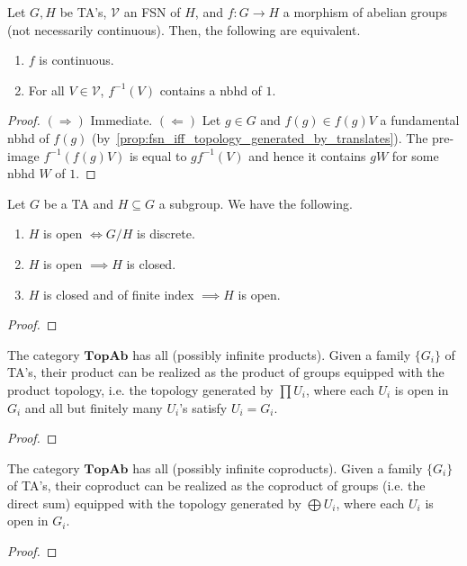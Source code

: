 \begin{proposition} Let $G, H$ be TA's, $\mathcal{V}$ an FSN of $H$, and $f : G \rightarrow H$ a morphism of abelian groups (not necessarily continuous). Then, the following are equivalent.
\begin{enumerate}
\item[(i)] $f$ is continuous.
\item[(ii)] For all $V \in \mathcal{V}$, $f^{-1}(V)$ contains a nbhd of $1$.
\end{enumerate}
\end{proposition}
\begin{proof} $(\Rightarrow)$ Immediate. $(\Leftarrow)$ Let $g \in G$ and $f(g) \in f(g)V$ a fundamental nbhd of $f(g)$ (by~\cref{prop:fsn_iff_topology_generated_by_translates}). The pre-image $f^{-1}(f(g) V)$ is equal to $gf^{-1}(V)$ and hence it contains $gW$ for some nbhd $W$ of $1$.
\end{proof}

\begin{proposition}\label{prop:basic_properties_about_open_sets} Let $G$ be a TA and $H \subseteq G$ a subgroup. We have the following.
\begin{enumerate}
    \item[(i)] $H$ is open $\iff G/H$ is discrete.
    \item[(ii)] $H$ is open $\implies H$ is closed.
    \item[(iii)] $H$ is closed and of finite index $\implies H$ is open.
\end{enumerate}
\end{proposition}
\begin{proof} \TODO
\end{proof}

\begin{proposition}\label{prop:topab_has_products} The category $\textbf{TopAb}$ has all (possibly infinite products). Given a family $\{G_i\}$ of TA's, their product can be realized as the product of groups equipped with the product topology, i.e. the topology generated by $\prod U_i$, where each $U_i$ is open in $G_i$ and all but finitely many $U_i$'s satisfy $U_i = G_i$.
\end{proposition}
\begin{proof} \TODO
\end{proof}


\begin{proposition}\label{prop:topab_has_coproducts} The category $\textbf{TopAb}$ has all (possibly infinite coproducts). Given a family $\{G_i\}$ of TA's, their coproduct can be realized as the coproduct of groups (i.e. the direct sum) equipped with the topology generated by $\bigoplus U_i$, where each $U_i$ is open in $G_i$.
\end{proposition}
\begin{proof} \TODO
\end{proof}

